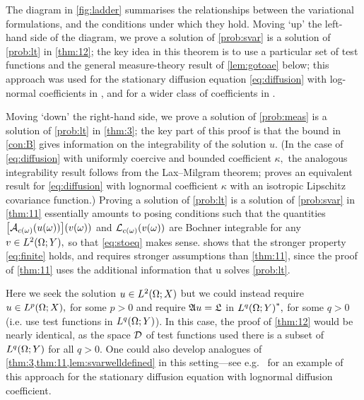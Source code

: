\label{rem:nontechnical}
The diagram in \cref{fig:ladder} summarises the relationships between the variational formulations, and the conditions under which they hold. Moving `up' the left-hand side of the diagram, we prove a solution of \cref{prob:svar} is a solution of \cref{prob:lt} in \cref{thm:12}; the key idea in this theorem is to use a particular set of test functions and the general measure-theory result of \cref{lem:gotoae} below; this approach was used for the stationary diffusion equation \eqref{eq:diffusion} with log-normal coefficients in \cite{Gi:10}, and for a wider class of coefficients in \cite{MuSt:11}.

Moving `down' the right-hand side, we prove a solution of \cref{prob:meas} is a solution of \cref{prob:lt} in \cref{thm:3}; the key part of this proof is that the bound in \cref{con:B} gives information on the integrability of the solution $u.$ (In the case of \eqref{eq:diffusion} with uniformly coercive and bounded coefficient $\kappa,$ the analogous integrability result follows from the Lax--Milgram theorem; \cite[Proposition 2.4]{Ch:12} proves an equivalent result for \eqref{eq:diffusion} with lognormal coefficient $\kappa$ with an isotropic Lipschitz covariance function.) Proving a solution of \cref{prob:lt} is a solution of \cref{prob:svar} in \cref{thm:11} essentially amounts to posing conditions such that the quantities $\mleft[\Acomega\mleft(u(\omega)\mright)\mright] \mleft(v(\omega)\mright)$ and $\Lcomega \mleft(v(\omega)\mright)$ are Bochner integrable for any $v \in \LtOY,$ so that \eqref{eq:stoeq} makes sense.  shows that the stronger property \eqref{eq:finite} holds, and requires stronger assumptions than \cref{thm:11}, since the proof of \cref{thm:11} uses the additional information that u solves \cref{prob:lt}.
\ere

Here we seek the solution $u \in \LtOX$ but we could instead require $u \in \LpOX,$ for some $p>0$ and require $\mathfrak{A} u = \mathfrak{L}$ in $\LqOYas,$ for some $q>0$ (i.e. use test functions in $\LqOY$). In this case, the proof of \cref{thm:12} would be nearly identical, as the space $\mathcal D$ of test functions used there %
is a subset of $\LqOY$ for all $q>0.$ One could also develop analogues of \cref{thm:3,thm:11,lem:svarwelldefined} in this setting---see e.g.~\cite[Theorem 3.20]{Gi:10} for an example of this approach for the stationary diffusion equation with lognormal diffusion coefficient.
\ere


